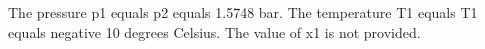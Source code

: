 The pressure p1 equals p2 equals 1.5748 bar. The temperature T1 equals T1 equals negative 10 degrees Celsius. The value of x1 is not provided.